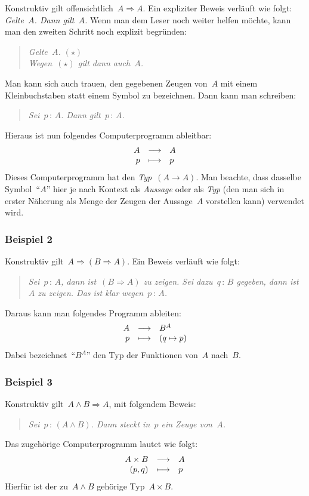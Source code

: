 \documentclass[a4paper,ngerman,12pt]{scrartcl}
\theoremstyle{definition}
\theoremstyle{plain}
\theoremstyle{remark}
\renewcommand{\_}{\mathpunct{.}\,}
\newcommand{\?}{\,{:}\,}
\begin{document}
Konstruktiv gilt offensichtlich~$A \Rightarrow A$. Ein expliziter Beweis
verläuft wie folgt: \emph{Gelte~$A$. Dann gilt~$A$.} Wenn man dem Leser noch
weiter helfen möchte, kann man den zweiten Schritt noch explizit begründen:
\begin{quote}\emph{Gelte~$A$. $(\star)$ \\ Wegen~$(\star)$ gilt dann
auch~$A$.}\end{quote}
Man kann sich auch trauen, den gegebenen Zeugen von~$A$ mit einem
Kleinbuchstaben statt einem Symbol zu bezeichnen. Dann kann man schreiben:
\begin{quote}\emph{Sei~$p\?A$. Dann gilt~$p\?A$.}\end{quote}
Hieraus ist nun folgendes Computerprogramm ableitbar:
\[ \begin{array}{@{}rcl@{}}
  A &\longrightarrow& A \\
  p &\longmapsto& p
\end{array} \]
Dieses Computerprogramm hat den \emph{Typ}~$(A \to A)$. Man beachte, dass
dasselbe Symbol~"`$A$"' hier je nach Kontext als \emph{Aussage} oder als
\emph{Typ} (den man sich in erster Näherung als Menge der Zeugen der
Aussage~$A$ vorstellen kann) verwendet wird.


\subsubsection*{Beispiel 2}

Konstruktiv gilt~$A \Rightarrow (B \Rightarrow A)$. Ein Beweis verläuft
wie folgt:
\begin{quote}\emph{Sei~$p\?A$, dann ist~$(B \Rightarrow A)$ zu zeigen. Sei
dazu~$q\?B$ gegeben, dann ist~$A$ zu zeigen. Das ist klar
wegen~$p\?A$.}\end{quote}
Daraus kann man folgendes Programm ableiten:
\[ \begin{array}{@{}rcl@{}}
  A &\longrightarrow& B^A \\
  p &\longmapsto& (q \mapsto p)
\end{array} \]
Dabei bezeichnet~"`$B^A$"' den Typ der Funktionen von~$A$ nach~$B$.


\subsubsection*{Beispiel 3}

Konstruktiv gilt~$A \wedge B \Rightarrow A$, mit folgendem Beweis:
\begin{quote}\emph{Sei~$p\?(A \wedge B)$. Dann steckt in~$p$ ein Zeuge
von~$A$.}\end{quote}
Das zugehörige Computerprogramm lautet wie folgt:
\[ \begin{array}{@{}rcl@{}}
  A \times B &\longrightarrow& A \\
  (p,q) &\longmapsto& p
\end{array} \]
Hierfür ist der zu~$A \wedge B$ gehörige Typ~$A \times B$.
\end{document}
